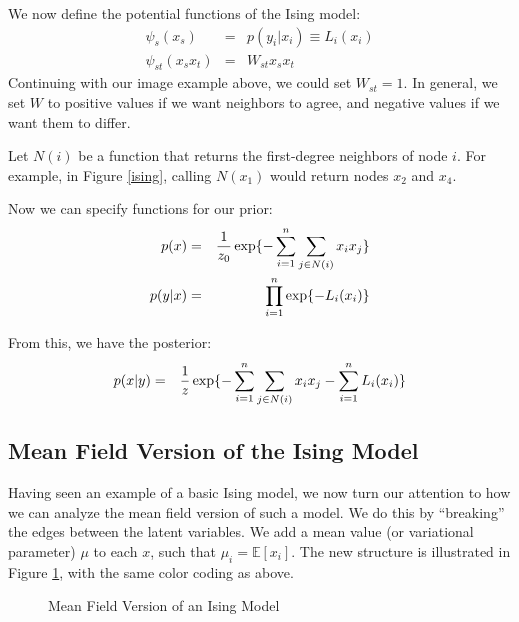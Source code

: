 \documentclass[twoside]{article}
\begin{document}
We now define the potential functions of the Ising model:
\begin{eqnarray*}
\psi_s(x_s) &=& p(y_i | x_i) \equiv L_i(x_i) \\
\psi_{st} (x_s x_t) &=& W_{st} x_s x_t 
\end{eqnarray*} 
Continuing with our image example above, we could set $W_{st}=1$. In general, we set $W$ to positive values if we want neighbors to agree, and negative values if we want them to differ. 

Let $N(i)$ be a function that returns the first-degree neighbors of node $i$. For example, in Figure \ref{ising}, calling $N(x_1)$ would return nodes $x_2$ and $x_4$.

Now we can specify functions for our prior:
\begin{eqnarray*}
p(x) &=& {1 \over z_0} \exp\{ - \sum_{i=1}^n \sum_{j \in N(i)} x_i x_j \} \\
p(y|x) &=& \prod_{i=1}^n \exp \{-L_i(x_i) \} 
\end{eqnarray*}

From this, we have the posterior:
\begin{eqnarray*}
p(x|y) &=& {1 \over z} \exp \{ - \sum_{i=1}^n  \sum_{j \in N(i)} x_i x_j - \sum_{i=1}^n L_i(x_i) \}
\end{eqnarray*}

\subsection{Mean Field Version of the Ising Model}

Having seen an example of a basic Ising model, we now turn our attention to how we can analyze the mean field version of such a model. We do this by ``breaking'' the edges between the latent variables. We add a mean value (or variational parameter) $\mu$ to each $x$, such that $\mu_i=\mathbb{E}[x_i]$. The new structure is illustrated in Figure \ref{meanfield}, with the same color coding as above. 

\begin{figure}[h!]
\begin{center}
\end{center}
\caption{Mean Field Version of an Ising Model}
\label{meanfield}
\end{figure}
\end{document}
